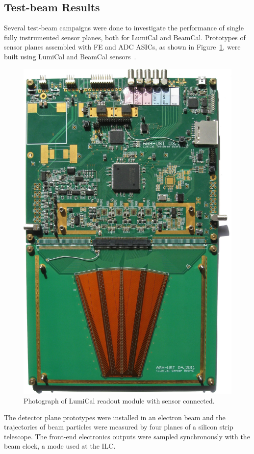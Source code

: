 \subsection{Test-beam Results}
Several test-beam campaigns were done to investigate the performance of single fully instrumented sensor planes,
both for LumiCal and BeamCal.
Prototypes of sensor planes assembled with FE and ADC ASICs,
as shown in Figure~\ref{fig:fcal_lumical_module_photo},
were built using LumiCal and BeamCal sensors~\cite{1748-0221-7-01-T01004}.
\begin{figure}[hbp]
\centering
\includegraphics[width=0.35\columnwidth,angle=90]{Calorimeter/FCAL/figs/tb3_complete_module}
\caption{Photograph of LumiCal readout module with sensor connected.}
\label{fig:fcal_lumical_module_photo}
\end{figure}
The detector plane prototypes were installed in an electron beam and
the trajectories of beam particles were measured by four planes of a silicon strip
telescope.
The front-end electronics outputs were sampled synchronously with the
beam clock, a mode used at the ILC.
